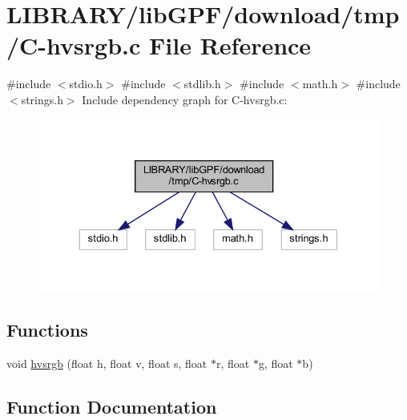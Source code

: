\hypertarget{C-hvsrgb_8c}{}\section{L\+I\+B\+R\+A\+R\+Y/lib\+G\+P\+F/download/tmp/\+C-\/hvsrgb.c File Reference}
\label{C-hvsrgb_8c}
{\ttfamily \#include $<$stdio.\+h$>$}\newline
{\ttfamily \#include $<$stdlib.\+h$>$}\newline
{\ttfamily \#include $<$math.\+h$>$}\newline
{\ttfamily \#include $<$strings.\+h$>$}\newline
Include dependency graph for C-\/hvsrgb.c\+:
\nopagebreak
\begin{figure}[H]
\begin{center}
\leavevmode
\includegraphics[width=330pt]{C-hvsrgb_8c__incl}
\end{center}
\end{figure}
\subsection*{Functions}
\begin{DoxyCompactItemize}
\item 
void \hyperlink{C-hvsrgb_8c_a3e696875abb711e0bda0e666bf6828e3}{hvsrgb} (float h, float v, float s, float $\ast$r, float $\ast$g, float $\ast$b)
\end{DoxyCompactItemize}


\subsection{Function Documentation}
\mbox{\label{C-hvsrgb_8c_a3e696875abb711e0bda0e666bf6828e3}} 
